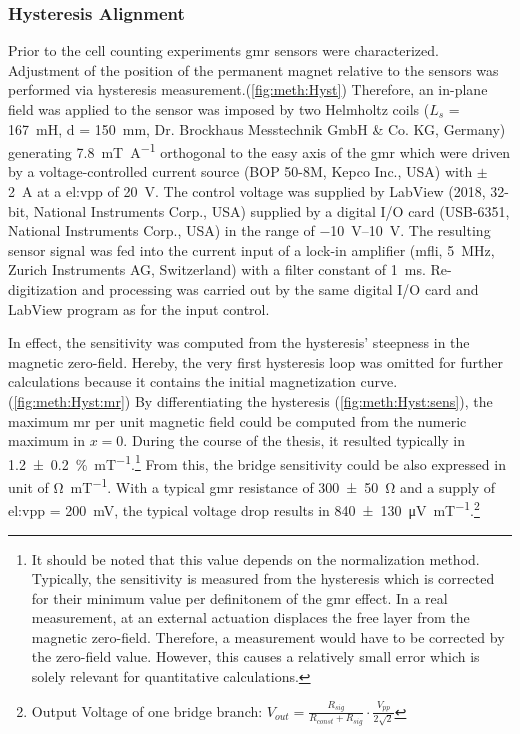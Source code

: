 \subsubsection{Hysteresis Alignment}
Prior to the cell counting experiments \gls{gmr} sensors were characterized.  Adjustment of the position of the permanent magnet relative to the sensors was performed via hysteresis measurement.(\cref{fig:meth:Hyst})  Therefore, an in-plane field was applied to the sensor was imposed by two Helmholtz coils ($L_s$ = \SI{167}{\milli\henry}, d = \SI{150}{\milli\meter}, Dr. Brockhaus Messtechnik GmbH \& Co. KG, Germany) generating \SI{7.8}{\milli\tesla\per\ampere} orthogonal to the easy axis of the \gls{gmr} which were driven by a voltage-controlled current source (BOP 50-8M, Kepco Inc., USA) with $\pm$ \SI{2}{\ampere} at a \gls{el:vpp} of \SI{20}{\volt}. The control voltage was supplied by LabView (2018, 32-bit, National Instruments Corp., USA) supplied by a digital I/O card (USB-6351, National Instruments Corp., USA) in the range of \SIrange{-10}{10}{\volt}.
The resulting sensor signal was fed into the current input of a lock-in amplifier (\gls{mfli}, \SI{5}{\mega\hertz}, Zurich Instruments AG, Switzerland) with a filter constant of \SI{1}{\milli\second}.
Re-digitization and processing was carried out by the same digital I/O card and LabView program as for the input control.

In effect, the sensitivity was computed from the hysteresis' steepness in the magnetic zero-field. Hereby, the very first hysteresis loop was omitted for further calculations because it contains the initial magnetization curve.(\cref{fig:meth:Hyst:mr}) By differentiating the hysteresis (\cref{fig:meth:Hyst:sens}), the maximum \gls{mr} per unit magnetic field could be computed from the numeric maximum in $x = 0$. During the course of the thesis, it resulted typically in \SI{1.2 +- 0.2}{\percent\per\milli\tesla}.\footnote{It should be noted that this value depends on the normalization method. Typically, the sensitivity is measured from the hysteresis which is corrected for their minimum value per definitonem of the \gls{gmr} effect. In a real measurement, at an external actuation displaces the free layer from the magnetic zero-field. Therefore, a measurement would have to be corrected by the zero-field value. However, this causes a relatively small error which is solely relevant for quantitative calculations.} From this, the bridge sensitivity could be also expressed in unit of \si{\ohm\per\milli\tesla}. With a typical \gls{gmr} resistance of \SI{300 +- 50}{\ohm} and a supply of \gls{el:vpp} = \SI{200}{\milli\volt}, the typical voltage drop results in \SI{840 +- 130}{\micro\volt\per\milli\tesla}.\footnote{Output Voltage of one bridge branch: $V_{out} = \frac{R_{sig}}{R_{const}+R_{sig}}\cdot \frac{V_{pp}}{2\sqrt{2}}$}
